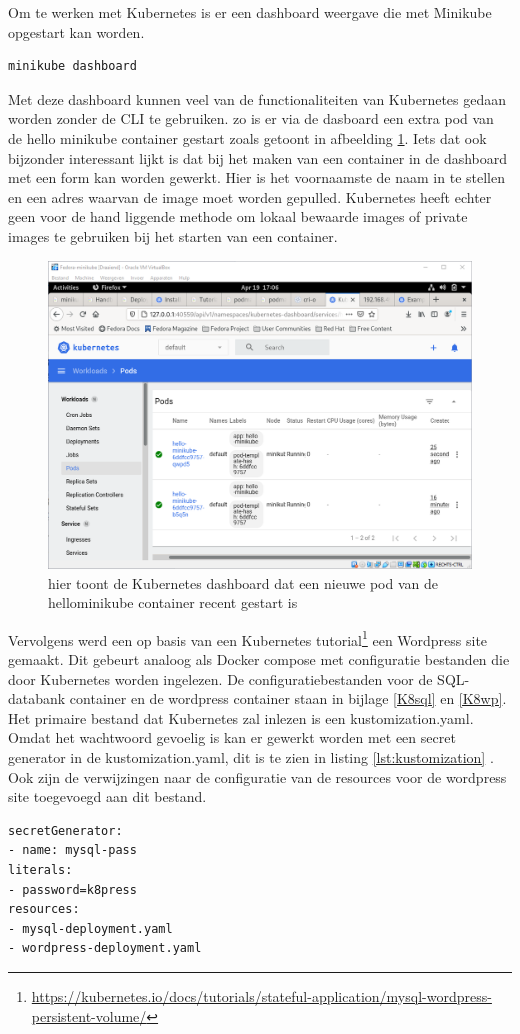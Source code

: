 Om te werken met Kubernetes is er een dashboard weergave die met Minikube opgestart kan worden.
\begin{verbatim}
minikube dashboard
\end{verbatim}
Met deze dashboard kunnen veel van de functionaliteiten van Kubernetes gedaan worden zonder de CLI te gebruiken. zo is er via de dasboard een extra pod van de hello minikube container gestart zoals getoont in afbeelding \ref{fig:kubenetesDash}. Iets dat ook bijzonder interessant lijkt is dat bij het maken van een container in de dashboard met een form kan worden gewerkt. Hier is het voornaamste de naam in te stellen en een adres waarvan de image moet worden gepulled. Kubernetes heeft echter geen voor de hand liggende methode om lokaal bewaarde images of private images te gebruiken bij het starten van een container.
\begin{figure}[h]
    \includegraphics[width=\linewidth]{img/kubenetesDash.png}
    \caption[the kubenetes Dashboard]{hier toont de Kubernetes dashboard dat een nieuwe pod van de hellominikube container recent gestart is}
    \label{fig:kubenetesDash}
    \centering
\end{figure}

Vervolgens werd een op basis van een Kubernetes tutorial\footnote{\url{https://kubernetes.io/docs/tutorials/stateful-application/mysql-wordpress-persistent-volume/}}  een Wordpress site gemaakt. Dit gebeurt analoog als Docker compose met configuratie bestanden die door Kubernetes worden ingelezen. De configuratiebestanden voor de SQL-databank container en de wordpress container staan in bijlage \ref{K8sql} en \ref{K8wp}. Het primaire bestand dat Kubernetes zal inlezen is een kustomization.yaml. Omdat het wachtwoord gevoelig is kan er gewerkt worden met een secret generator in de kustomization.yaml, dit is te zien in listing \ref{lst:kustomization} . Ook zijn de verwijzingen naar de configuratie van de resources voor de wordpress site toegevoegd aan dit bestand.
\begin{lstlisting}[caption=inhoud van kustomization.yaml,label=lst:kustomization]
secretGenerator:
- name: mysql-pass
literals:
- password=k8press
resources:
- mysql-deployment.yaml
- wordpress-deployment.yaml
\end{lstlisting}

